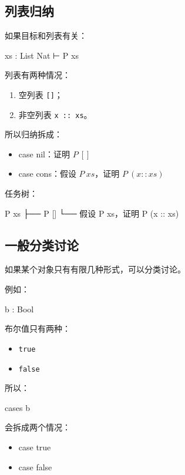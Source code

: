 \documentclass[UTF8,12pt]{ctexart}
\begin{document}
\subsection{列表归纳}

如果目标和列表有关：

\begin{LeanCode}
xs : List Nat
⊢ P xs
\end{LeanCode}

列表有两种情况：
\begin{enumerate}
  \item 空列表 \texttt{[]}；
  \item 非空列表 \texttt{x :: xs}。
\end{enumerate}

所以归纳拆成：
\begin{itemize}
  \item case nil：证明 \(P\ []\)
  \item case cons：假设 \(P\ xs\)，证明 \(P\ (x :: xs)\)
\end{itemize}

任务树：

\begin{Tree}
P xs
├── P []
└── 假设 P xs，证明 P (x :: xs)
\end{Tree}

\subsection{一般分类讨论}

如果某个对象只有有限几种形式，可以分类讨论。

例如：

\begin{LeanCode}
b : Bool
\end{LeanCode}

布尔值只有两种：
\begin{itemize}
  \item \texttt{true}
  \item \texttt{false}
\end{itemize}

所以：

\begin{LeanCode}
cases b
\end{LeanCode}

会拆成两个情况：
\begin{itemize}
  \item case true
  \item case false
\end{itemize}
\end{document}
